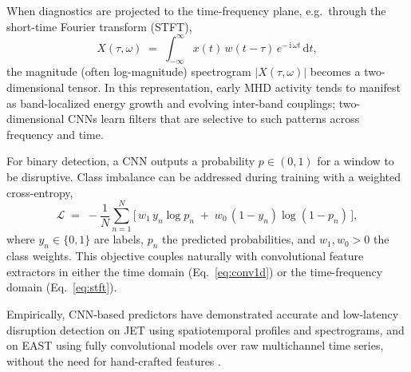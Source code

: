 When diagnostics are projected to the time-frequency plane, e.g.\ through the short-time Fourier transform (\ac{STFT}),
\begin{equation}
X(\tau,\omega)\;=\;\int_{-\infty}^{\infty} x(t)\, w(t-\tau)\, e^{-\,\mathrm{i}\,\omega t}\,\mathrm{d}t,
\label{eq:stft}
\end{equation}
the magnitude (often log-magnitude) spectrogram $|X(\tau,\omega)|$ becomes a two-dimensional tensor. In this representation, early \ac{MHD} activity tends to manifest as band-localized energy growth and evolving inter-band couplings; two-dimensional \ac{CNN}s learn filters that are selective to such patterns across frequency and time.

For binary detection, a \ac{CNN} outputs a probability $p\in(0,1)$ for a window to be disruptive. Class imbalance can be addressed during training with a weighted cross-entropy,
\begin{equation}
\mathcal{L}\;=\;-\frac{1}{N}\sum_{n=1}^{N}\Big[\,w_1\, y_n\log p_n \;+\; w_0\,(1-y_n)\log(1-p_n)\,\Big],
\label{eq:weighted_bce}
\end{equation}
where $y_n\in\{0,1\}$ are labels, $p_n$ the predicted probabilities, and $w_1,w_0>0$ the class weights. This objective couples naturally with convolutional feature extractors in either the time domain (Eq.~\eqref{eq:conv1d}) or the time-frequency domain (Eq.~\eqref{eq:stft}).

Empirically, \ac{CNN}-based predictors have demonstrated accurate and low-latency disruption detection on \ac{JET} using spatiotemporal profiles and spectrograms, and on \ac{EAST} using fully convolutional models over raw multichannel time series, without the need for hand-crafted features \cite{aymerichCNNDisruptionPredictor2023,guoDisruptionPredictionUsing2020}.
